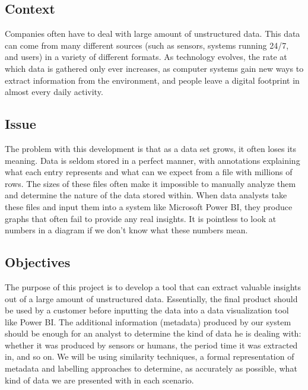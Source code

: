 \subsection{Context}
Companies often have to deal with large amount of unstructured data.
This data can come from many different sources (such as sensors, systems running 24/7, and users) in a variety of
different formats.
As technology evolves, the rate at which data is gathered only ever increases, as computer systems gain new ways to
extract information from the environment, and people leave a digital footprint in almost every daily activity.

\subsection{Issue}
The problem with this development is that as a data set grows, it often loses its meaning.
Data is seldom stored in a perfect manner, with annotations explaining what each entry represents and what can we
expect from a file with millions of rows.
The sizes of these files often make it impossible to manually analyze them and determine the nature of the data stored within.
When data analysts take these files and input them into a system like Microsoft Power BI, they produce graphs that often fail to
provide any real insights. 
It is pointless to look at numbers in a diagram if we don't know what these numbers mean.

\subsection{Objectives}
The purpose of this project is to develop a tool that can extract valuable insights out of a large amount of unstructured data.
Essentially, the final product should be used by a customer before inputting the data into a data visualization tool like Power BI.
The additional information (metadata) produced by our system should be enough for an analyst to determine the kind of data
he is dealing with: whether it was produced by sensors or humans, the period time it was extracted in, and so on.
We will be using similarity techniques, a formal representation of metadata and labelling approaches to determine, as
accurately as possible, what kind of data we are presented with in each scenario.